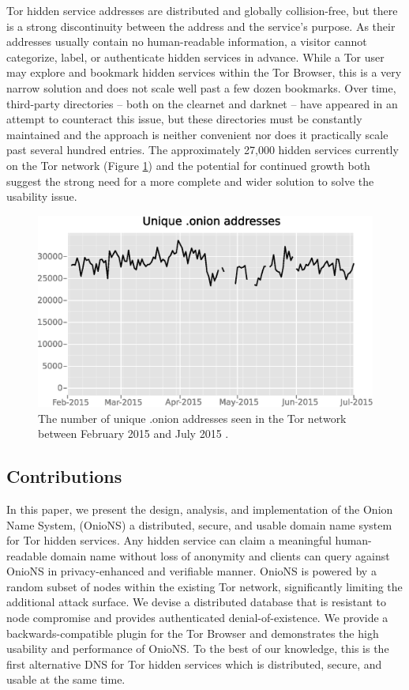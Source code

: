 \documentclass[USenglish,oneside,twocolumn]{article}
\begin{document}
Tor hidden service addresses are distributed and globally collision-free, but there is a strong discontinuity between the address and the service's purpose. As their addresses usually contain no human-readable information, a visitor cannot categorize, label, or authenticate hidden services in advance. While a Tor user may explore and bookmark hidden services within the Tor Browser, this is a very narrow solution and does not scale well past a few dozen bookmarks. Over time, third-party directories -- both on the clearnet and darknet -- have appeared in an attempt to counteract this issue, but these directories must be constantly maintained and the approach is neither convenient nor does it practically scale past several hundred entries. The approximately 27,000 hidden services currently on the Tor network (Figure \ref{fig:OnionCount}) and the potential for continued growth both suggest the strong need for a more complete and wider solution to solve the usability issue.

\begin{figure}[htbp]
	\centering
	\includegraphics[width=\linewidth]{../assets/images/Tor/onion_2015-02_2015-07.eps}
	\caption{The number of unique .onion addresses seen in the Tor network between February 2015 and July 2015 \cite{kadianakis2015extrapolating, TorMetrics}.}
	\label{fig:OnionCount}
\end{figure}

\subsection{Contributions}

In this paper, we present the design, analysis, and implementation of the Onion Name System, (OnioNS) a distributed, secure, and usable domain name system for Tor hidden services. Any hidden service can claim a meaningful human-readable domain name without loss of anonymity and clients can query against OnioNS in privacy-enhanced and verifiable manner. OnioNS is powered by a random subset of nodes within the existing Tor network, significantly limiting the additional attack surface. We devise a distributed database that is resistant to node compromise and provides authenticated denial-of-existence. We provide a backwards-compatible plugin for the Tor Browser and demonstrates the high usability and performance of OnioNS. To the best of our knowledge, this is the first alternative DNS for Tor hidden services which is distributed, secure, and usable at the same time.
\end{document}

